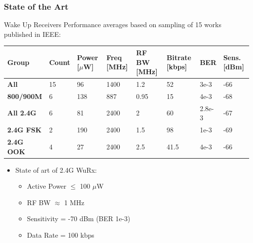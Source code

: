 \documentclass[t, screen, aspectratio=43]{beamer}
\begin{document}

\begin{frame}
	\frametitle{State of the Art}
	\begin{block}{Wake Up Receivers}
		\footnotesize
		Performance averages based on sampling of 15 works published in IEEE:
		\scriptsize
		\vspace{-1em}
		\begin{table}[htb!]
			\tiny
			\centering
			\def\arraystretch{1.5}		
			\setlength\arrayrulewidth{0.75pt}
			\setlength{\tabcolsep}{1em} %
			\begin{tabular}{|l|l|l|l|l|l|l|l|}
				\hline 
				\rule[-1ex]{0pt}{2.5ex} \cellcolor{gray!40}\textbf{Group} & \cellcolor{gray!40}\textbf{Count} & \cellcolor{gray!40}\textbf{Power [$\mu$W] }& \cellcolor{gray!40}\textbf{Freq [MHz]} & \cellcolor{gray!40}\textbf{RF BW [MHz]}& \cellcolor{gray!40}\textbf{Bitrate [kbps]}& \cellcolor{gray!40}\textbf{BER }& \cellcolor{gray!40}\textbf{Sens. [dBm]}\\ 
				\hline 
				\rule[-1ex]{0pt}{2.5ex} \textbf{All} & 15 & 96 & 1400 & 1.2 & 52 & 3e-3 & -66\\ 
				\hline 
				\rule[-1ex]{0pt}{2.5ex} \textbf{800/900M} & 6 & 138 & 887 & 0.95 & 15 & 4e-3 & -68\\ 
				\hline 
				\rule[-1ex]{0pt}{2.5ex} \textbf{All 2.4G} & 6 & 81 & 2400 & 2 & 60 & 2.8e-3 & -67\\ 
				\hline 
				\rule[-1ex]{0pt}{2.5ex} \textbf{2.4G FSK} & 2 & 190 & 2400 & 1.5 & 98 & 1e-3 & -69\\ 
				\hline 
				\rule[-1ex]{0pt}{2.5ex} \textbf{2.4G OOK} & 4 & 27 & 2400 & 2.5 & 41.5 & 4e-3 & -66\\ 
				\hline 
			\end{tabular} 
		\end{table}   
		\begin{itemize}
			\footnotesize
			\item State of art of 2.4G WuRx:
			\begin{itemize}
				\item Active Power $\leq$ 100 $\mu$W
				\item RF BW $\approx$ 1 MHz
				\item Sensitivity = -70 dBm (BER 1e-3)
				\item Data Rate = 100 kbps
			\end{itemize}
		\end{itemize}

	\end{block}

\end{frame}
\end{document}

